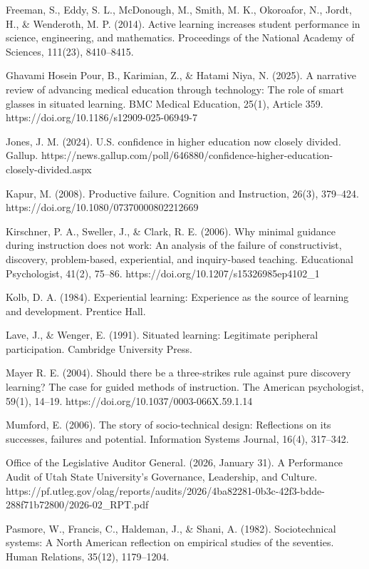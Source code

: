 \documentclass[
  12pt]{article}
\begin{document}
Freeman, S., Eddy, S. L., McDonough, M., Smith, M. K., Okoroafor, N.,
Jordt, H., \& Wenderoth, M. P. (2014). Active learning increases student
performance in science, engineering, and mathematics. Proceedings of the
National Academy of Sciences, 111(23), 8410--8415.

Ghavami Hosein Pour, B., Karimian, Z., \& Hatami Niya, N. (2025). A
narrative review of advancing medical education through technology: The
role of smart glasses in situated learning. BMC Medical Education,
25(1), Article 359. https://doi.org/10.1186/s12909-025-06949-7

Jones, J. M. (2024). U.S. confidence in higher education now closely
divided. Gallup.
https://news.gallup.com/poll/646880/confidence-higher-education-closely-divided.aspx

Kapur, M. (2008). Productive failure. Cognition and Instruction, 26(3),
379--424. https://doi.org/10.1080/07370000802212669

Kirschner, P. A., Sweller, J., \& Clark, R. E. (2006). Why minimal
guidance during instruction does not work: An analysis of the failure of
constructivist, discovery, problem-based, experiential, and
inquiry-based teaching. Educational Psychologist, 41(2), 75--86.
https://doi.org/10.1207/s15326985ep4102\_1

Kolb, D. A. (1984). Experiential learning: Experience as the source of
learning and development. Prentice Hall.

Lave, J., \& Wenger, E. (1991). Situated learning: Legitimate peripheral
participation. Cambridge University Press.

Mayer R. E. (2004). Should there be a three-strikes rule against pure
discovery learning? The case for guided methods of instruction. The
American psychologist, 59(1), 14--19.
https://doi.org/10.1037/0003-066X.59.1.14

Mumford, E. (2006). The story of socio-technical design: Reflections on
its successes, failures and potential. Information Systems Journal,
16(4), 317--342.

Office of the Legislative Auditor General. (2026, January 31). A
Performance Audit of Utah State University's Governance, Leadership, and
Culture.
https://pf.utleg.gov/olag/reports/audits/2026/4ba82281-0b3c-42f3-bdde-288f71b72800/2026-02\_RPT.pdf

Pasmore, W., Francis, C., Haldeman, J., \& Shani, A. (1982).
Sociotechnical systems: A North American reflection on empirical studies
of the seventies. Human Relations, 35(12), 1179--1204.
\end{document}
